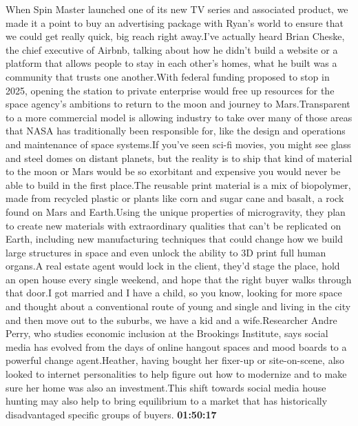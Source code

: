 \documentclass{article}%
\begin{document}
When Spin Master launched one of its new TV series and associated product, we made it a point to buy an advertising package with Ryan's world to ensure that we could get really quick, big reach right away.I've actually heard Brian Cheske, the chief executive of Airbnb, talking about how he didn't build a website or a platform that allows people to stay in each other's homes, what he built was a community that trusts one another.With federal funding proposed to stop in 2025, opening the station to private enterprise would free up resources for the space agency's ambitions to return to the moon and journey to Mars.Transparent to a more commercial model is allowing industry to take over many of those areas that NASA has traditionally been responsible for, like the design and operations and maintenance of space systems.If you've seen sci{-}fi movies, you might see glass and steel domes on distant planets, but the reality is to ship that kind of material to the moon or Mars would be so exorbitant and expensive you would never be able to build in the first place.The reusable print material is a mix of biopolymer, made from recycled plastic or plants like corn and sugar cane and basalt, a rock found on Mars and Earth.Using the unique properties of microgravity, they plan to create new materials with extraordinary qualities that can't be replicated on Earth, including new manufacturing techniques that could change how we build large structures in space and even unlock the ability to 3D print full human organs.A real estate agent would lock in the client, they'd stage the place, hold an open house every single weekend, and hope that the right buyer walks through that door.I got married and I have a child, so you know, looking for more space and thought about a conventional route of young and single and living in the city and then move out to the suburbs, we have a kid and a wife.Researcher Andre Perry, who studies economic inclusion at the Brookings Institute, says social media has evolved from the days of online hangout spaces and mood boards to a powerful change agent.Heather, having bought her fixer{-}up or site{-}on{-}scene, also looked to internet personalities to help figure out how to modernize and to make sure her home was also an investment.This shift towards social media house hunting may also help to bring equilibrium to a market that has historically disadvantaged specific groups of buyers.%
\textbf{01:50:17}%
\newline%
\end{document}

